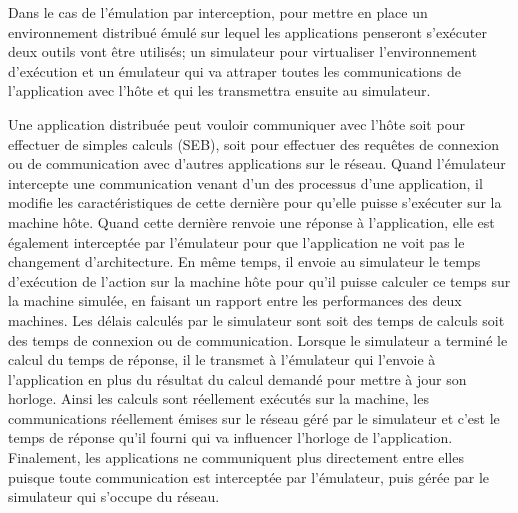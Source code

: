 Dans le cas de l'émulation par interception, pour mettre en place un
  environnement distribué émulé sur lequel les applications penseront
  s'exécuter deux outils vont être utilisés; un simulateur pour virtualiser
l'environnement d'exécution et un émulateur qui va attraper toutes les
communications de l'application avec l'hôte et qui les transmettra ensuite au
simulateur.

 Une application distribuée peut vouloir communiquer avec l'hôte soit pour
 effectuer de simples calculs (SEB), soit pour effectuer des requêtes de
 connexion ou de communication avec d'autres applications sur le réseau. Quand
 l'émulateur intercepte une communication venant d'un des processus d'une
 application, il modifie les caractéristiques de cette dernière pour qu'elle
 puisse s'exécuter sur la machine hôte. Quand cette dernière renvoie une réponse
 à l'application, elle est également interceptée par l'émulateur pour que
 l'application ne voit pas le changement d'architecture. En même temps, il
 envoie au simulateur le temps d'exécution de l'action sur la machine hôte pour
 qu'il puisse calculer ce temps sur la machine simulée, en faisant un rapport
 entre les performances des deux machines. Les délais calculés par le simulateur
 sont soit des temps de calculs soit des temps de connexion ou de
 communication. Lorsque le simulateur a terminé le calcul du temps de réponse,
 il le transmet à l'émulateur qui l'envoie à l'application en plus du résultat
 du calcul demandé pour mettre à jour son horloge.  Ainsi les calculs sont
 réellement exécutés sur la machine, les communications réellement émises sur le
 réseau géré par le simulateur et c'est le temps de réponse qu'il fourni qui va
 influencer l'horloge de l'application. Finalement, les applications ne
 communiquent plus directement entre elles puisque toute communication est
 interceptée par l'émulateur, puis gérée par le simulateur qui s'occupe du
 réseau.

